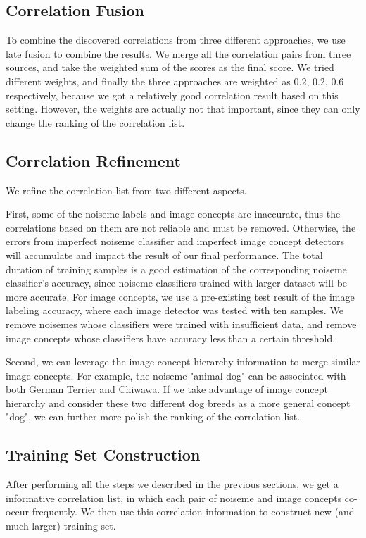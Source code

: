 \documentclass[conference, 11pt, onecolumn]{IEEEtran}
\begin{document}
\subsection{Correlation Fusion}
To combine the discovered correlations from three different approaches, we use late fusion to combine the results. We merge all the correlation pairs from three sources, and take the weighted sum of the scores as the final score. We tried different weights, and finally the three approaches are weighted as $0.2$, $0.2$, $0.6$ respectively, because we got a relatively good correlation result based on this setting. However, the weights are actually not that important, since they can only change the ranking of the correlation list.

\subsection{Correlation Refinement}
We refine the correlation list from two different aspects.

First, some of the noiseme labels and image concepts are inaccurate, thus the correlations based on them are not reliable and must be removed. Otherwise, the errors from imperfect noiseme classifier and imperfect image concept detectors will accumulate and impact the result of our final performance. The total duration of training samples is a good estimation of the corresponding noiseme classifier's accuracy, since noiseme classifiers trained with larger dataset will be more accurate. For image concepts, we use a pre-existing test result of the image labeling accuracy, where each image detector was tested with ten samples. We remove noisemes whose classifiers were trained with insufficient data, and remove image concepts whose classifiers have accuracy less than a certain threshold.

Second, we can leverage the image concept hierarchy information to merge similar image concepts. For example, the noiseme "animal-dog" can be associated with both German Terrier and Chiwawa. If we take advantage of image concept hierarchy and consider these two different dog breeds as a more general concept "dog", we can further more polish the ranking of the correlation list.

\subsection{Training Set Construction}
\label{section:trainingconst}
After performing all the steps we described in the previous sections, we get a informative correlation list, in which each pair of noiseme and image concepts co-occur frequently. We then use this correlation information to construct new (and much larger) training set.
\end{document}
